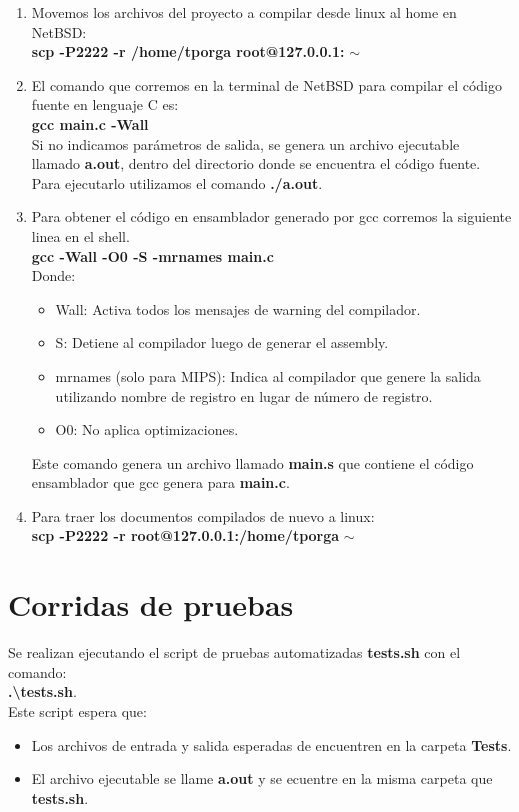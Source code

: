 \documentclass[a4paper,10pt]{article}
\begin{document}
\begin{enumerate}[1.]
	\item Movemos los archivos del proyecto a compilar desde linux al
	home en NetBSD:\\
	\textbf{scp -P2222 -r /home/tporga root@127.0.0.1: }$\sim$

	\item El comando que corremos en la terminal de NetBSD para compilar
	el c\'odigo fuente en lenguaje C es:\\
	\textbf{gcc main.c -Wall}\\
	Si no indicamos par\'ametros de salida, se genera un archivo ejecutable
	llamado \textbf{a.out}, dentro del directorio donde se encuentra el
	c\'odigo fuente. Para ejecutarlo utilizamos el comando \textbf{./a.out}.

	\item Para obtener el c\'odigo en ensamblador generado por gcc
	corremos la siguiente linea en el shell.\\
	\textbf{gcc -Wall -O0 -S -mrnames main.c}\\
	Donde:
	\begin{itemize}
		\item Wall: Activa todos los mensajes de warning del compilador.
		\item S: Detiene al compilador luego de generar el assembly.
		\item mrnames (solo para MIPS): Indica al compilador que
		genere la salida utilizando nombre de registro en lugar
		de n\'umero de registro.
		\item O0: No aplica optimizaciones.
	\end{itemize}
	Este comando genera un archivo llamado \textbf{main.s} que contiene el
	c\'odigo ensamblador que gcc genera para \textbf{main.c}.
	\item Para traer los documentos compilados de nuevo a linux:\\
	\textbf{scp -P2222 -r root@127.0.0.1:/home/tporga }$\sim$
\end{enumerate}
\newpage
\section{Corridas de pruebas}
Se realizan ejecutando el script de pruebas automatizadas \textbf{tests.sh} con
el comando:\\
\textbf{.\textbackslash tests.sh}.\\
Este script espera que:
\begin{itemize}
	\item Los archivos de entrada y salida esperadas de encuentren
	en la carpeta \textbf{Tests}.
	\item El archivo ejecutable se llame \textbf{a.out} y se ecuentre en la misma
	carpeta que \textbf{tests.sh}.
\end{itemize}
\end{document}
